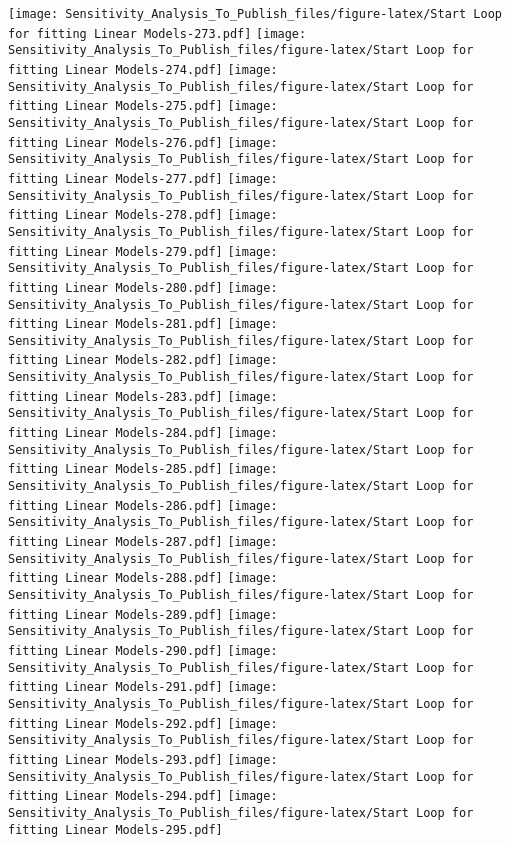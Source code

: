 \documentclass[
]{article}
\begin{document}
\texttt{[image: Sensitivity\_Analysis\_To\_Publish\_files/figure-latex/Start Loop for fitting Linear Models-273.pdf]}
\texttt{[image: Sensitivity\_Analysis\_To\_Publish\_files/figure-latex/Start Loop for fitting Linear Models-274.pdf]}
\texttt{[image: Sensitivity\_Analysis\_To\_Publish\_files/figure-latex/Start Loop for fitting Linear Models-275.pdf]}
\texttt{[image: Sensitivity\_Analysis\_To\_Publish\_files/figure-latex/Start Loop for fitting Linear Models-276.pdf]}
\texttt{[image: Sensitivity\_Analysis\_To\_Publish\_files/figure-latex/Start Loop for fitting Linear Models-277.pdf]}
\texttt{[image: Sensitivity\_Analysis\_To\_Publish\_files/figure-latex/Start Loop for fitting Linear Models-278.pdf]}
\texttt{[image: Sensitivity\_Analysis\_To\_Publish\_files/figure-latex/Start Loop for fitting Linear Models-279.pdf]}
\texttt{[image: Sensitivity\_Analysis\_To\_Publish\_files/figure-latex/Start Loop for fitting Linear Models-280.pdf]}
\texttt{[image: Sensitivity\_Analysis\_To\_Publish\_files/figure-latex/Start Loop for fitting Linear Models-281.pdf]}
\texttt{[image: Sensitivity\_Analysis\_To\_Publish\_files/figure-latex/Start Loop for fitting Linear Models-282.pdf]}
\texttt{[image: Sensitivity\_Analysis\_To\_Publish\_files/figure-latex/Start Loop for fitting Linear Models-283.pdf]}
\texttt{[image: Sensitivity\_Analysis\_To\_Publish\_files/figure-latex/Start Loop for fitting Linear Models-284.pdf]}
\texttt{[image: Sensitivity\_Analysis\_To\_Publish\_files/figure-latex/Start Loop for fitting Linear Models-285.pdf]}
\texttt{[image: Sensitivity\_Analysis\_To\_Publish\_files/figure-latex/Start Loop for fitting Linear Models-286.pdf]}
\texttt{[image: Sensitivity\_Analysis\_To\_Publish\_files/figure-latex/Start Loop for fitting Linear Models-287.pdf]}
\texttt{[image: Sensitivity\_Analysis\_To\_Publish\_files/figure-latex/Start Loop for fitting Linear Models-288.pdf]}
\texttt{[image: Sensitivity\_Analysis\_To\_Publish\_files/figure-latex/Start Loop for fitting Linear Models-289.pdf]}
\texttt{[image: Sensitivity\_Analysis\_To\_Publish\_files/figure-latex/Start Loop for fitting Linear Models-290.pdf]}
\texttt{[image: Sensitivity\_Analysis\_To\_Publish\_files/figure-latex/Start Loop for fitting Linear Models-291.pdf]}
\texttt{[image: Sensitivity\_Analysis\_To\_Publish\_files/figure-latex/Start Loop for fitting Linear Models-292.pdf]}
\texttt{[image: Sensitivity\_Analysis\_To\_Publish\_files/figure-latex/Start Loop for fitting Linear Models-293.pdf]}
\texttt{[image: Sensitivity\_Analysis\_To\_Publish\_files/figure-latex/Start Loop for fitting Linear Models-294.pdf]}
\texttt{[image: Sensitivity\_Analysis\_To\_Publish\_files/figure-latex/Start Loop for fitting Linear Models-295.pdf]}
\end{document}
